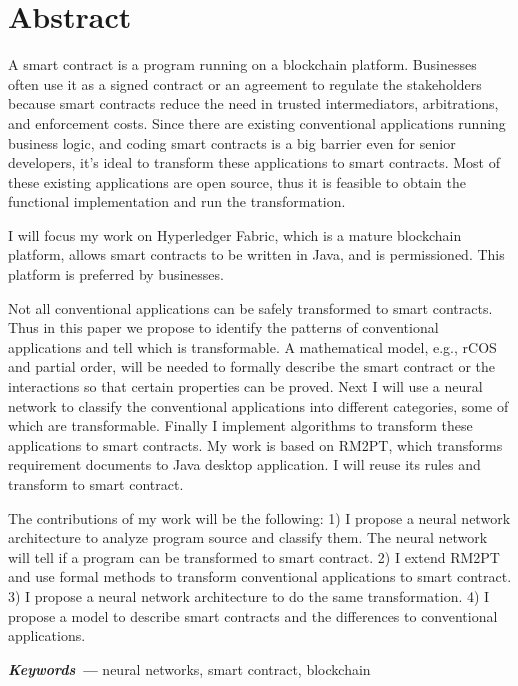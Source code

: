 \chapter{Abstract}

A smart contract is a program running on a blockchain platform.
Businesses often use it as a signed contract or an agreement to regulate the stakeholders
because smart contracts reduce the need in trusted intermediators, arbitrations, and enforcement costs.
Since there are existing conventional applications running business logic,
and coding smart contracts is a big barrier even for senior developers,
it's ideal to transform these applications to smart contracts.
Most of these existing applications are open source, thus it is feasible to obtain the functional implementation and run the transformation.

I will focus my work on Hyperledger Fabric,
which is a mature blockchain platform, allows smart contracts to be written in Java, and is permissioned.
This platform is preferred by businesses.

Not all conventional applications can be safely transformed to smart contracts.
Thus in this paper we propose to identify the patterns of conventional applications and tell which is transformable.
A mathematical model, e.g., rCOS and partial order, will be needed to formally describe the smart contract or the interactions so that certain properties can be proved.
Next I will use a neural network to classify the conventional applications into different categories, some of which are transformable.
Finally I implement algorithms to transform these applications to smart contracts.
My work is based on RM2PT, which transforms requirement documents to Java desktop application. I will reuse its rules and transform to smart contract.


The contributions of my work will be the following:
1) I propose a neural network architecture to analyze program source and classify them. The neural network will tell if a program can be transformed to smart contract.
2) I extend RM2PT and use formal methods to transform conventional applications to smart contract.
3) I propose a neural network architecture to do the same transformation.
4) I propose a model to describe smart contracts and the differences to conventional applications.



\textbf{\textit{Keywords ---}} neural networks, smart contract, blockchain